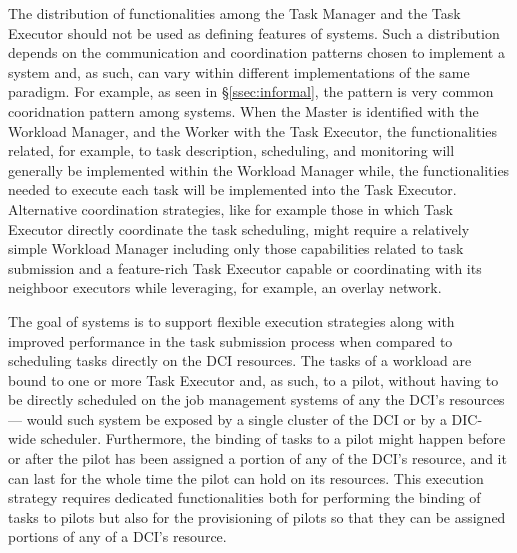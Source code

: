 \documentclass{sig-alternate}
\begin{document}
The distribution of functionalities among the Task Manager and the Task
Executor should not be used as defining features of \pilot systems.
Such a distribution depends on the communication and coordination patterns
chosen to implement a \pilot system and, as such, can vary within
different implementations of the same paradigm. For example, as seen in
\S\ref{ssec:informal}, the \MW pattern is very common cooridnation
pattern among \pilot systems. When the Master is identified with the
Workload Manager, and the Worker with the Task Executor, the
functionalities related, for example, to task description, scheduling,
and monitoring will generally be implemented within the Workload Manager
while, the functionalities needed to execute each task will be
implemented into the Task Executor. Alternative coordination strategies,
like for example those in which Task Executor directly coordinate the
task scheduling, might require a relatively simple Workload Manager
including only those capabilities related to task submission
 and a
feature-rich Task Executor capable or coordinating with its neighboor
executors while leveraging, for example, an overlay network.


The goal of \pilotjob systems is to support flexible execution
strategies along with improved performance in the task submission
process when compared to scheduling tasks directly on the DCI resources.
The tasks of a workload are bound to one or more Task Executor and, as
such, to a pilot, without having to be directly scheduled on the job
management systems of any the DCI's resources --- would such system be
exposed by a single cluster of the DCI or by a DIC- wide scheduler.
Furthermore, the binding of tasks to a pilot might happen before or
after the pilot has been assigned a portion of any of the DCI's
resource, and it can last for the whole time the pilot can hold on its
resources. This execution strategy requires dedicated functionalities
both for performing the binding of tasks to pilots but also for the
provisioning of pilots so that they can be assigned portions of any of a
DCI's resource.
\end{document}
